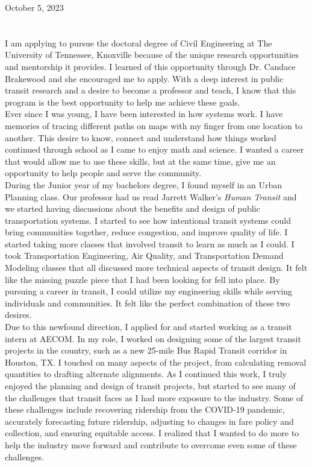 \documentclass{resume} %
\begin{document}
October 5, 2023\\\\\\

I am applying to pursue the doctoral degree of Civil Engineering at The University of Tennessee, Knoxville because of the unique research opportunities and mentorship it provides. I learned of this opportunity through Dr. Candace Brakewood and she encouraged me to apply. With a deep interest in public transit research and a desire to become a professor and teach, I know that this program is the best opportunity to help me achieve these goals. \\

Ever since I was young, I have been interested in how systems work. I have memories of tracing different paths on maps with my finger from one location to another. This desire to know, connect and understand how things worked continued through school as I came to enjoy math and science. I wanted a career that would allow me to use these skills, but at the same time, give me an opportunity to help people and serve the community. \\

During the Junior year of my bachelors degree, I found myself in an Urban Planning class. Our professor had us read Jarrett Walker’s {\em Human Transit} and we started having discussions about the benefits and design of public transportation systems. I started to see how intentional transit systems could bring communities together, reduce congestion, and improve quality of life. I started taking more classes that involved transit to learn as much as I could. I took Transportation Engineering, Air Quality, and Transportation Demand Modeling classes that all discussed more technical aspects of transit design. It felt like the missing puzzle piece that I had been looking for fell into place. By pursuing a career in transit, I could utilize my engineering skills while serving individuals and communities. It felt like the perfect combination of these two desires.\\

Due to this newfound direction, I applied for and started working as a transit intern at AECOM. In my role, I worked on designing some of the largest transit projects in the country, such as a new 25-mile Bus Rapid Transit corridor in Houston, TX. I touched on many aspects of the project, from calculating removal quantities to drafting alternate alignments. As I continued this work, I truly enjoyed the planning and design of transit projects, but started to see many of the challenges that transit faces as I had more exposure to the industry. Some of these challenges include recovering ridership from the COVID-19 pandemic, accurately forecasting future ridership, adjusting to changes in fare policy and collection, and ensuring equitable access. I realized that I wanted to do more to help the industry move forward and contribute to overcome even some of these challenges. \\
\end{document}
